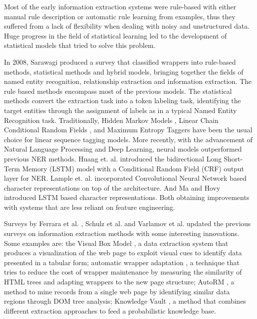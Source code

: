 \documentclass[sigconf]{acmart}
\begin{document}
Most of the early information extraction systems were rule-based with either 
manual rule description or automatic rule learning from examples, thus they
suffered from a lack of flexibility when dealing with noisy and unstructured data.
Huge progress in the field of statistical learning led to the development of
statistical models that tried to solve this problem.

In 2008, Sarawagi \cite{Sarawagi2008} produced a survey that classified wrappers into
rule-based methods, statistical methods and hybrid models, bringing together 
the fields of named entity recognition, relationship extraction and information extraction. 
The rule based methods encompass most of the 
previous models. The statistical methods convert the extraction task into a token labeling 
task, identifying the target entities through the assignment of labels as in a typical 
Named Entity Recognition task. Traditionally, Hidden Markov Models \cite{Leek1997, Freitag1999}, 
Linear Chain Conditional Random Fields \cite{Lafferty2001}, and Maximum Entropy Taggers 
\cite{McCallum2000} have been the usual choice for linear sequence tagging models.
More recently, with the advancement of Natural Language Processing and Deep Learning, 
neural models outperformed previous NER methods. Huang et. al. \cite{Huang2015} introduced the 
bidirectional Long Short-Term Memory (LSTM) model with a Conditional Random Field (CRF) output layer
for NER. Lample et. al. \cite{Lample2016} incorporated Convolutional Neural Network based character representations 
on top of the architecture. And Ma and Hovy \cite{Ma2016} introduced
LSTM based character representations. Both obtaining improvements with systems that are less reliant
on feature engineering.

Surveys by Ferrara et al. \cite{Ferrara2014}, Schulz et al. \cite{Schulz2016} and 
Varlamov et al. \cite{Varlamov2016} updated the previous surveys on information 
extraction methods with some interesting innovations. 
Some examples are: the Visual Box Model \cite{Krupl2005}, a data extraction system that produces 
a visualization of the web page to exploit visual cues to identify data presented in a tabular form;
automatic wrapper adaptation \cite{Ferrara2011}, a technique that tries to reduce the cost of 
wrapper maintenance by measuring the similarity of HTML trees and adapting
wrappers to the new page structure; AutoRM \cite{Shi2015}, a method to mine
records from a single web page by identifying similar data regions through DOM
tree analysis; Knowledge Vault \cite{Dong2014}, a method that combines different 
extraction approaches to feed a probabilistic knowledge base.
\end{document}
